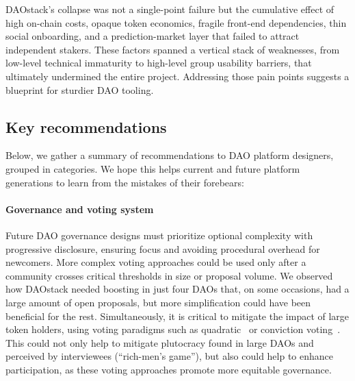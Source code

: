\documentclass[10pt,lineno]{wlpeerj}
\begin{document}
DAOstack’s collapse was not a single-point failure but the cumulative effect of high on-chain costs, opaque token economics, fragile front-end dependencies, thin social onboarding, and a prediction-market layer that failed to attract independent stakers. These factors spanned a vertical stack of weaknesses, from low-level technical immaturity to high-level group usability barriers, that ultimately undermined the entire project. Addressing those pain points suggests a blueprint for sturdier DAO tooling.

\subsection{Key recommendations}

Below, we gather a summary of recommendations to DAO platform designers, grouped in categories. We hope this helps current and future platform generations to learn from the mistakes of their forebears:

\paragraph{Governance and voting system}

Future DAO governance designs must prioritize optional complexity with progressive disclosure, ensuring focus and avoiding procedural overhead for newcomers. More complex voting approaches could be used only after a community crosses critical thresholds in size or proposal volume. We observed how DAOstack needed boosting in just four DAOs that, on some occasions, had a large amount of open proposals, but more simplification could have been beneficial for the rest. 
Simultaneously, it is critical to mitigate the impact of large token holders, using voting paradigms such as quadratic~\citep{Benhaim2023} or conviction voting~\citep{conviction_emmett}. This could not only help to mitigate plutocracy found in large DAOs and perceived by interviewees (``rich-men’s game''), but also could help to enhance participation, as these voting approaches promote more equitable governance.


\end{document}
